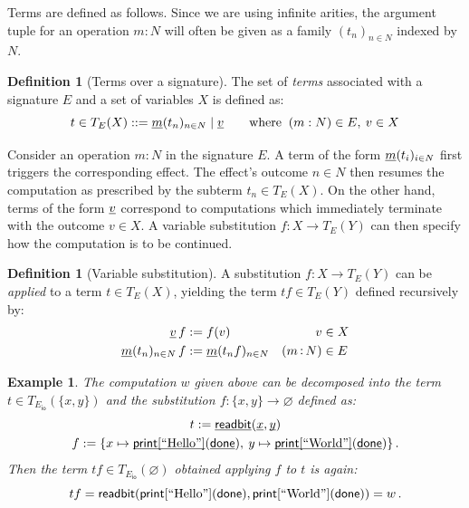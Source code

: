 \documentclass[11pt,oneside,draft]{book}
\newtheorem{example}[theorem]{Example}
\theoremstyle{definition}
\newtheorem{definition}[theorem]{Definition}
\newcommand{\kw}[1]{\ensuremath{ \mathsf{#1} }}
\newcommand{\ul}[1]{%
  \underline{\smash{#1}}
}
\begin{document}
Terms are defined as follows.
Since we are using infinite arities,
the argument tuple for an operation $m \mathop: N$
will often be given as a family $(t_n)_{n \in N}$
indexed by $N$.

\begin{definition}[Terms over a signature] %
The set of \emph{terms} associated with
a signature $E$ and a set of variables $X$
is defined as:
\[
  t \in T_E(X) ::=
    \ul{m}(t_n)_{n \in N} \mid
    \ul{v}
  \qquad
  \text{where }
  \:
    (m : N) \in E, \:
    v \in X
\]
\end{definition}

Consider an operation $m \mathop: N$ in the signature $E$.
A term of the form $\ul{m}(t_i)_{i \in N}$
first triggers the corresponding effect.
The effect's outcome $n \in N$ then resumes the computation
as prescribed by the subterm $t_n \in T_E(X)$.
On the other hand,
terms of the form $\ul{v}$ correspond to computations
which immediately terminate with the outcome $v \in X$.
A variable substitution $f : X \rightarrow T_E(Y)$
can then specify how the computation is to be continued.

\begin{definition}[Variable substitution] %
A substitution $f : X \rightarrow T_E(Y)$
can be \emph{applied} to a term $t \in T_E(X)$,
yielding the term $t f \in T_E(Y)$
defined recursively by:
\begin{align*}
  \ul{v} \, f &:= f(v) & v &\in X \\
  \ul{m}(t_n)_{n \in N} \, f &:=
    \ul{m}(t_n f)_{n \in N} & (m \mathop: N) &\in E
\end{align*}
\end{definition}

\begin{example} %
The computation $w$ given above can be decomposed into
the term $t \in T_{E_\kw{io}}(\{x, y\})$ and
the substitution $f : \{x, y\} \rightarrow \varnothing$
defined as:
\begin{gather*}
  t := \ul{\kw{readbit}}(\ul{x}, \ul{y})
  \\
  f := \{
    x \mapsto \ul{\kw{print}[\text{\rm ``Hello''}]}(
                \ul{\kw{done}}), \:
    y \mapsto \ul{\kw{print}[\text{\rm ``World''}]}(
                \ul{\kw{done}})
  \}
  \,.
\end{gather*}
Then the term
$tf \in T_{E_\kw{io}}(\varnothing)$
obtained applying $f$ to $t$ is again:
\[
  t f =
    \kw{readbit}(
      \kw{print}[\text{\rm ``Hello''}](\kw{done}),
      \kw{print}[\text{\rm ``World''}](\kw{done}))
    = w
  \,.
\]
\end{example}
\end{document}
